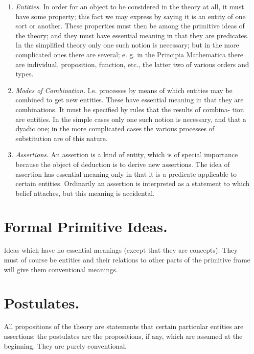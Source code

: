 \documentclass[10pt, twoside]{extarticle}
\newcommand\litem[1]{\item{\textit{#1}}}
\theoremstyle{breaktheorem}
\theoremstyle{mylemma}
\theoremstyle{mydefinition}
\theoremstyle{mycorollary}
\begin{document}
\begin{enumerate}[label=\arabic*.,font=\itshape,wide]
\litem{Entities.} In order for an object to be considered in the theory at
all, it must have some property; this fact we may express by saying it is
an entity of one sort or another. These properties must then be among the
primitive ideas of the theory; and they must have essential meaning in
that they are predicates. In the simplified theory only one such notion is
necessary; but in the more complicated ones there are several; e. g. in the
Principia Mathematica there are individual, proposition, function, etc., the
latter two of various orders and types.

\litem{Modes of Combination.} I.e. processes by means of which entities may
be combined to get new entities. These have essential meaning in that they
are combinations. It must be specified by rules that the results of combina-
tion are entities. In the simple cases only one such notion is necessary, and
that a dyadic one; in the more complicated cases the various processes of
substitution are of this nature.

\litem{Assertions.} An assertion is a kind of entity, which is of special
importance because the object of deduction is to derive new assertions. The
idea of assertion has essential meaning only in that it is a predicate applicable
to certain entities. Ordinarily an assertion is interpreted as a statement to
which belief attaches, but this meaning is accidental.
\end{enumerate}

\section{Formal Primitive Ideas.}
Ideas which have no essential meanings (except that they are concepts).
They must of course be entities and their relations to other parts of the
primitive frame will give them conventional meanings.

\section{Postulates.}
All propositions of the theory are statements that certain particular
entities are assertions; the postulates are the propositions, if any, which are
assumed at the beginning. They are purely conventional.
\end{document}
